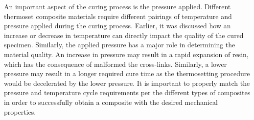 An important aspect of the curing process is the pressure applied.  Different thermoset composite materials require different pairings of temperature and pressure applied during the curing process.  Earlier, it was discussed how an increase or decrease in temperature can directly impact the quality of the cured specimen.  Similarly, the applied pressure has a major role in determining the material quality.  An increase in pressure may result in a rapid expansion of resin, which has the consequence of malformed the cross-links.  Similarly, a lower pressure may result in a longer required cure time as the thermosetting procedure would be decelerated by the lower pressure.  It is important to properly match the pressure and temperature cycle requirements per the different types of composites in order to successfully obtain a composite with the desired mechanical properties.